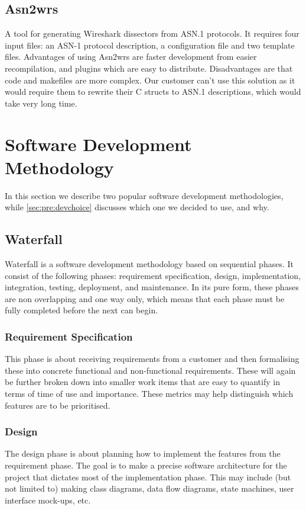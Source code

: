 \subsection{Asn2wrs}
A tool for generating Wireshark dissectors from ASN.1 protocols. It requires
four input files: an ASN-1 protocol description, a configuration file and two
template files. Advantages of using Asn2wrs are faster development from
easier recompilation, and plugins which are easy to distribute. Disadvantages
are that code and makefiles are more complex. Our customer can't use this
solution as it would require them to rewrite their C structs to ASN.1
descriptions, which would take very long time.


\section{Software Development Methodology}
\label{sec:pre:method}
In this section we describe two popular software development methodologies,
while \autoref{sec:pre:devchoice} discusses which one we decided to use, and
why.

\subsection{Waterfall}
\label{sec:pre:waterfall}
Waterfall is a software development methodology based on sequential phases.
It consist of the following phases: requirement specification, design,
implementation, integration, testing, deployment, and maintenance. In its pure
form, these phases are non overlapping and one way only, which means that each
phase must be fully completed before the next can begin.

\subsubsection{Requirement Specification}
This phase is about receiving requirements from a customer and then formalising
these into concrete functional and non-functional requirements. These will
again be further broken down into smaller work items that are easy to quantify
in terms of time of use and importance. These metrics may help distinguish
which features are to be prioritised.

\subsubsection{Design}
The design phase is about planning how to implement the features from the
requirement phase. The goal is to make a precise software architecture for the
project that dictates most of the implementation phase. This may include (but
not limited to) making class diagrams, data flow diagrams, state machines, user
interface mock-ups, etc.

